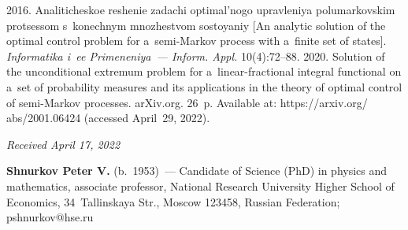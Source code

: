 \begin{multicols}{2}
{{\begin{thebibliography}{99}
 2016. Analiticheskoe reshenie zadachi optimal'nogo upravleniya polumarkovskim protsessom 
 s~konechnym mnozhestvom sostoyaniy [An analytic solution of the optimal control problem for 
 a~semi-Markov process with a~finite set of states]. \textit{Informatika i~ee Primeneniya~--- Inform. Appl.}
  10(4):72--88.
 2020. Solution of the unconditional extremum problem for 
a~linear-fractional integral functional on a~set of probability measures and its applications in
 the theory of optimal control of  semi-Markov processes. \mbox{arXiv}.org. 26~p. 
 Available at: {\sf https://arxiv.org/ abs/2001.06424} (accessed April~29, 2022).
 \end{thebibliography}

 }
 }

\end{multicols}

\vspace*{-6pt}

\hfill{\small\textit{Received April 17, 2022}}
 
\Contrl

\noindent
\textbf{Shnurkov Peter V.} (b.\ 1953)~--- 
Candidate of Science (PhD) in physics and mathematics, associate professor, National Research University 
Higher School of Economics, 34~Tallinskaya Str., Moscow 123458, Russian Federation; \mbox{pshnurkov@hse.ru}


\label{end\stat}

\renewcommand{\bibname}{\protect\rm Литература}    